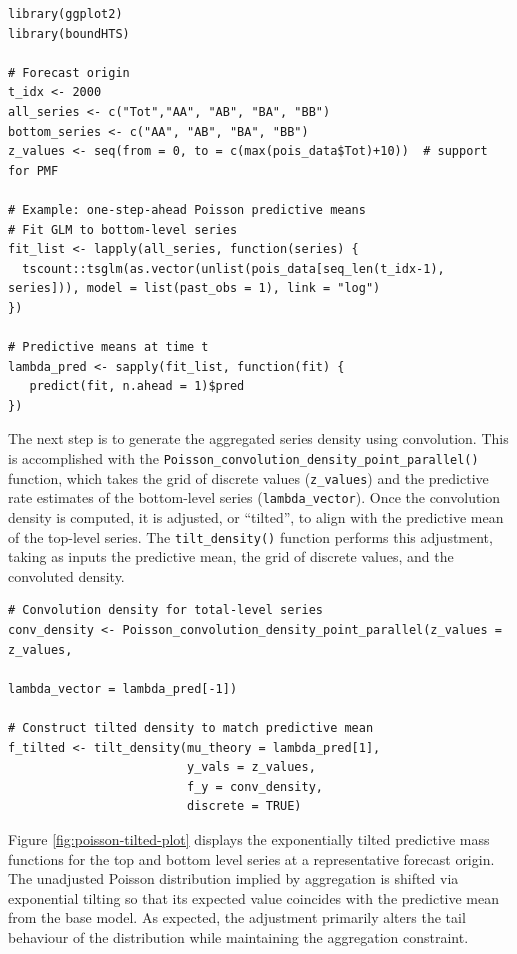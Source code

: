 \begin{verbatim}
library(ggplot2)
library(boundHTS)

# Forecast origin 
t_idx <- 2000
all_series <- c("Tot","AA", "AB", "BA", "BB")
bottom_series <- c("AA", "AB", "BA", "BB")
z_values <- seq(from = 0, to = c(max(pois_data$Tot)+10))  # support for PMF

# Example: one-step-ahead Poisson predictive means 
# Fit GLM to bottom-level series
fit_list <- lapply(all_series, function(series) {
  tscount::tsglm(as.vector(unlist(pois_data[seq_len(t_idx-1), series])), model = list(past_obs = 1), link = "log")
})

# Predictive means at time t
lambda_pred <- sapply(fit_list, function(fit) {
   predict(fit, n.ahead = 1)$pred
})
\end{verbatim}

The next step is to generate the aggregated series density using convolution. This is accomplished with the \texttt{Poisson\_convolution\_density\_point\_parallel()} function, which takes the grid of discrete values (\texttt{z\_values}) and the predictive rate estimates of the bottom-level series (\texttt{lambda\_vector}). Once the convolution density is computed, it is adjusted, or ``tilted'', to align with the predictive mean of the top-level series. The \texttt{tilt\_density()} function performs this adjustment, taking as inputs the predictive mean, the grid of discrete values, and the convoluted density.

\begin{verbatim}
# Convolution density for total-level series 
conv_density <- Poisson_convolution_density_point_parallel(z_values = z_values,
                                                           lambda_vector = lambda_pred[-1])

# Construct tilted density to match predictive mean 
f_tilted <- tilt_density(mu_theory = lambda_pred[1],
                         y_vals = z_values,
                         f_y = conv_density,
                         discrete = TRUE)
\end{verbatim}

Figure \ref{fig:poisson-tilted-plot} displays the exponentially tilted predictive mass functions for the top and bottom level series at a representative forecast origin. The unadjusted Poisson distribution implied by aggregation is shifted via exponential tilting so that its expected value coincides with the predictive mean from the base model. As expected, the adjustment primarily alters the tail behaviour of the distribution while maintaining the aggregation constraint.

